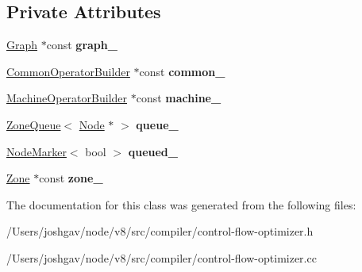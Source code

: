 \subsection*{Private Attributes}
\begin{DoxyCompactItemize}
\item 
\hyperlink{classv8_1_1internal_1_1compiler_1_1_graph}{Graph} $\ast$const {\bfseries graph\+\_\+}\hypertarget{classv8_1_1internal_1_1compiler_1_1_control_flow_optimizer_a44e5d8e63a1d847fb4ccef3929729f90}{}\label{classv8_1_1internal_1_1compiler_1_1_control_flow_optimizer_a44e5d8e63a1d847fb4ccef3929729f90}

\item 
\hyperlink{classv8_1_1internal_1_1compiler_1_1_common_operator_builder}{Common\+Operator\+Builder} $\ast$const {\bfseries common\+\_\+}\hypertarget{classv8_1_1internal_1_1compiler_1_1_control_flow_optimizer_a3e6cf0a6939690f97178474c5227c3cd}{}\label{classv8_1_1internal_1_1compiler_1_1_control_flow_optimizer_a3e6cf0a6939690f97178474c5227c3cd}

\item 
\hyperlink{classv8_1_1internal_1_1compiler_1_1_machine_operator_builder}{Machine\+Operator\+Builder} $\ast$const {\bfseries machine\+\_\+}\hypertarget{classv8_1_1internal_1_1compiler_1_1_control_flow_optimizer_a584356ad01c813ae0a20bcbecafeb125}{}\label{classv8_1_1internal_1_1compiler_1_1_control_flow_optimizer_a584356ad01c813ae0a20bcbecafeb125}

\item 
\hyperlink{classv8_1_1internal_1_1_zone_queue}{Zone\+Queue}$<$ \hyperlink{classv8_1_1internal_1_1compiler_1_1_node}{Node} $\ast$ $>$ {\bfseries queue\+\_\+}\hypertarget{classv8_1_1internal_1_1compiler_1_1_control_flow_optimizer_a8843d3174df77e3fb93f11d6614de5e2}{}\label{classv8_1_1internal_1_1compiler_1_1_control_flow_optimizer_a8843d3174df77e3fb93f11d6614de5e2}

\item 
\hyperlink{classv8_1_1internal_1_1compiler_1_1_node_marker}{Node\+Marker}$<$ bool $>$ {\bfseries queued\+\_\+}\hypertarget{classv8_1_1internal_1_1compiler_1_1_control_flow_optimizer_ac2d75174a8200c15e19b6b658602413a}{}\label{classv8_1_1internal_1_1compiler_1_1_control_flow_optimizer_ac2d75174a8200c15e19b6b658602413a}

\item 
\hyperlink{classv8_1_1internal_1_1_zone}{Zone} $\ast$const {\bfseries zone\+\_\+}\hypertarget{classv8_1_1internal_1_1compiler_1_1_control_flow_optimizer_a8ddf4b5430b225c7e4f18370ba63fb01}{}\label{classv8_1_1internal_1_1compiler_1_1_control_flow_optimizer_a8ddf4b5430b225c7e4f18370ba63fb01}

\end{DoxyCompactItemize}


The documentation for this class was generated from the following files\+:\begin{DoxyCompactItemize}
\item 
/\+Users/joshgav/node/v8/src/compiler/control-\/flow-\/optimizer.\+h\item 
/\+Users/joshgav/node/v8/src/compiler/control-\/flow-\/optimizer.\+cc\end{DoxyCompactItemize}
